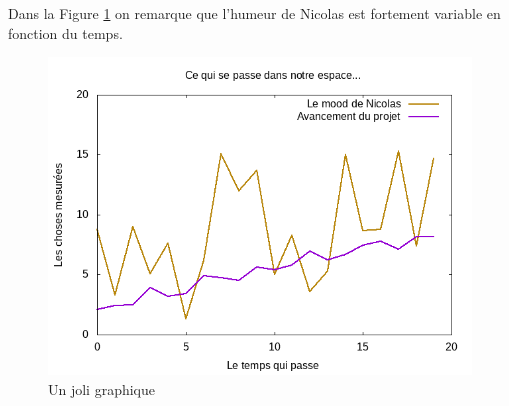 \documentclass[french]{article}
\begin{document}
Dans la Figure \ref{fig:test} on remarque que l'humeur de Nicolas est fortement variable en fonction du temps.

\begin{figure}[ht]
    \centering
    \includegraphics[width=1\textwidth]{test}
    \caption{Un joli graphique}
    \label{fig:test}
\end{figure}

\end{document}

